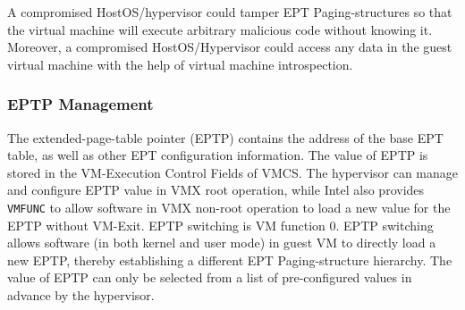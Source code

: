 A compromised HostOS/hypervisor could tamper EPT Paging-structures so that the virtual machine will execute arbitrary malicious code without knowing it. 
Moreover, a compromised HostOS/Hypervisor could access any data in the guest virtual machine with the help of virtual machine introspection.

\subsubsection{EPTP Management}%
\label{ssub:eptp_management}
The extended-page-table pointer (EPTP) contains the address of the base EPT table, as well as other EPT configuration information. 
The value of EPTP is stored in the VM-Execution Control Fields of VMCS. 
The hypervisor can manage and configure EPTP value in VMX root operation, while Intel also provides \verb|VMFUNC| to allow software in VMX non-root operation to load a new value for the EPTP without VM-Exit.
EPTP switching is VM function 0. EPTP switching allows software (in both kernel and user mode) in guest VM to directly load a new EPTP, thereby establishing a different EPT Paging-structure hierarchy. 
The value of EPTP can only be selected from a list of pre-configured values in advance by the hypervisor. 





